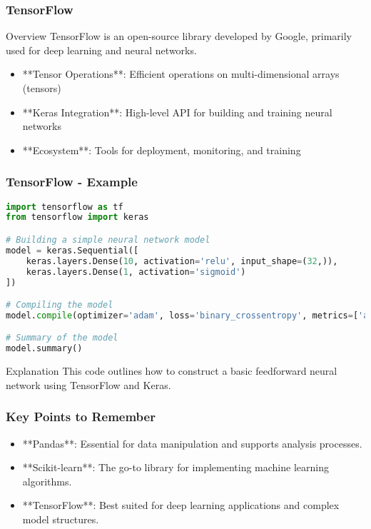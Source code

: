\documentclass[aspectratio=169]{beamer}
\begin{document}
\begin{frame}
    \frametitle{TensorFlow}
    \begin{block}{Overview}
        TensorFlow is an open-source library developed by Google, primarily used for deep learning and neural networks.
    \end{block}
    
    \begin{itemize}
        \item **Tensor Operations**: Efficient operations on multi-dimensional arrays (tensors)
        \item **Keras Integration**: High-level API for building and training neural networks
        \item **Ecosystem**: Tools for deployment, monitoring, and training
    \end{itemize}
\end{frame}

\begin{frame}[fragile]
    \frametitle{TensorFlow - Example}
    \begin{lstlisting}[language=Python]
import tensorflow as tf
from tensorflow import keras

# Building a simple neural network model
model = keras.Sequential([
    keras.layers.Dense(10, activation='relu', input_shape=(32,)),
    keras.layers.Dense(1, activation='sigmoid')
])

# Compiling the model
model.compile(optimizer='adam', loss='binary_crossentropy', metrics=['accuracy'])

# Summary of the model
model.summary()
    \end{lstlisting}
    \begin{block}{Explanation}
        This code outlines how to construct a basic feedforward neural network using TensorFlow and Keras.
    \end{block}
\end{frame}

\begin{frame}
    \frametitle{Key Points to Remember}
    \begin{itemize}
        \item **Pandas**: Essential for data manipulation and supports analysis processes.
        \item **Scikit-learn**: The go-to library for implementing machine learning algorithms.
        \item **TensorFlow**: Best suited for deep learning applications and complex model structures.
    \end{itemize}
\end{frame}
\end{document}
